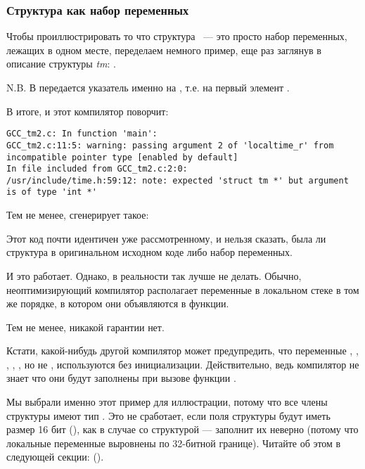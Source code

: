 ﻿\subsubsection{Структура как набор переменных}

Чтобы проиллюстрировать то что структура ~--- это просто набор переменных, лежащих в одном месте, 
переделаем немного пример, еще раз заглянув в описание структуры \emph{tm}: .



N.B. В  передается указатель именно на , 
т.е. на первый элемент .

В итоге, и этот компилятор поворчит:

\begin{lstlisting}[caption=GCC 4.7.3]
GCC_tm2.c: In function 'main':
GCC_tm2.c:11:5: warning: passing argument 2 of 'localtime_r' from incompatible pointer type [enabled by default]
In file included from GCC_tm2.c:2:0:
/usr/include/time.h:59:12: note: expected 'struct tm *' but argument is of type 'int *'
\end{lstlisting}

Тем не менее, сгенерирует такое:



Этот код почти идентичен уже рассмотренному, и нельзя сказать, была ли структура
в оригинальном исходном коде либо набор переменных.

И это работает. 
Однако, в реальности так лучше не делать. 
Обычно, неоптимизирующий компилятор располагает переменные в локальном
стеке в том же порядке, в котором они объявляются в функции.

Тем не менее, никакой гарантии нет.

Кстати, какой-нибудь другой компилятор может предупредить, что переменные , , ,
, , но не , используются без инициализации.
Действительно, ведь компилятор не знает что они будут заполнены при вызове функции
.

Мы выбрали именно этот пример для иллюстрации, потому что все члены структуры имеют тип \Tint.
Это не сработает, если поля структуры будут иметь размер 16 бит (), как в случае
со структурой  ---  
заполнит их неверно 
(потому что локальные переменные выровнены по 32-битной границе).
Читайте об этом в следующей секции: 
\q{\StructurePackingSectionName} ().

